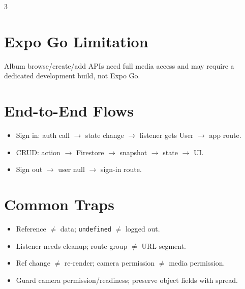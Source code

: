 \documentclass[10pt,a4paper]{article}
\begin{document}
\begin{multicols}{3}
\section*{Expo Go Limitation}
Album browse/create/add APIs need full media access and may require a dedicated development build, not Expo Go.

\section*{End-to-End Flows}
\begin{itemize}
  \item Sign in: auth call $\rightarrow$ state change $\rightarrow$ listener gets User $\rightarrow$ app route.
  \item CRUD: action $\rightarrow$ Firestore $\rightarrow$ snapshot $\rightarrow$ state $\rightarrow$ UI.
  \item Sign out $\rightarrow$ user null $\rightarrow$ sign-in route.
\end{itemize}

\section*{Common Traps}
\begin{itemize}
  \item Reference $\ne$ data; \texttt{undefined} $\ne$ logged out.
  \item Listener needs cleanup; route group $\ne$ URL segment.
  \item Ref change $\ne$ re-render; camera permission $\ne$ media permission.
  \item Guard camera permission/readiness; preserve object fields with spread.
\end{itemize}

\end{multicols}
\end{document}
